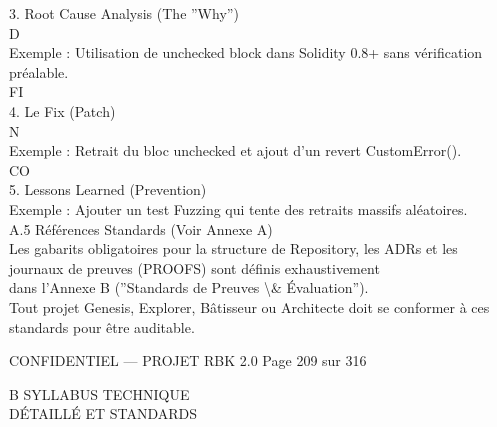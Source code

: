 3. Root Cause Analysis (The ”Why”)\\
\vspace{0.5em}
\vspace{0.5em}
\vspace{0.5em}
\vspace{0.5em}
D\\
Exemple : Utilisation de unchecked block dans Solidity 0.8+ sans vérification préalable.\\
\vspace{0.5em}
\vspace{0.5em}
\vspace{0.5em}
\vspace{0.5em}
FI\\
4. Le Fix (Patch)\\
\vspace{0.5em}
N\\
Exemple : Retrait du bloc unchecked et ajout d’un revert CustomError().\\
CO\\
5. Lessons Learned (Prevention)\\
Exemple : Ajouter un test Fuzzing qui tente des retraits massifs aléatoires.\\
\vspace{0.5em}
\vspace{0.5em}
\vspace{0.5em}
A.5     Références Standards (Voir Annexe A)\\
Les gabarits obligatoires pour la structure de Repository, les ADRs et les journaux de preuves (PROOFS) sont définis exhaustivement\\
dans l’Annexe B (”Standards de Preuves \textbackslash{}& Évaluation”).\\
Tout projet Genesis, Explorer, Bâtisseur ou Architecte doit se conformer à ces standards pour être auditable.\\
\vspace{0.5em}
\vspace{0.5em}
\vspace{0.5em}
\vspace{0.5em}
\begin{confidential}CONFIDENTIEL — PROJET RBK 2.0                                   Page 209 sur 316\end{confidential}
B \textbar{} SYLLABUS TECHNIQUE\\
DÉTAILLÉ ET STANDARDS\\
\vspace{0.5em}
\vspace{0.5em}
